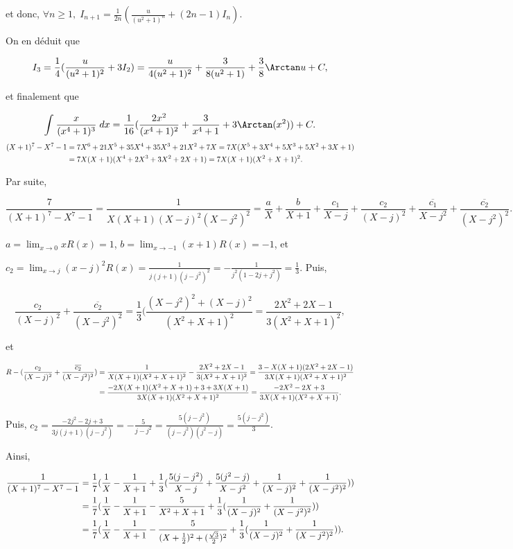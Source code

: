 {{et donc, $\forall n\geq1,\;I_{n+1}=\frac{1}{2n}(\frac{u}{(u^2+1)^n}+(2n-1)I_n)$.

On en déduit que

$$I_3=\frac{1}{4}(\frac{u}{(u^2+1)^2}+3I_2)=\frac{u}{4(u^2+1)^2}+\frac{3}{8(u^2+1)}+\frac{3}{8}\Arctan u+C,$$

et finalement que

$$\int_{}^{}\frac{x}{(x^4+1)^3}\;dx=\frac{1}{16}(\frac{2x^2}{(x^4+1)^2}+\frac{3}{x^4+1}+3\Arctan(x^2))+C.$$
\begin{align*}\ensuremath
(X+1)^7-X^7-1&=7X^6+21X^5+35X^4+35X^3+21X^2+7X=7X(X^5+3X^4+5X^3+5X^2+3X+1)\\
 &=7X(X+1)(X^4+2X^3+3X^2+2X+1)=7X(X+1)(X^2+X+1)^2.
\end{align*}

Par suite,

$$\frac{7}{(X+1)^7-X^7-1}=\frac{1}{X(X+1)(X-j)^2(X-j^2)^2}=\frac{a}{X}+\frac{b}{X+1}+\frac{c_1}{X-j}
+\frac{c_2}{(X-j)^2}+\frac{\overline{c_1}}{X-j^2}+\frac{\overline{c_2}}{(X-j^2)^2}.$$

$a=\lim_{x\rightarrow 0}xR(x)=1$, $b=\lim_{x\rightarrow -1}(x+1)R(x)=-1$, et

$c_2=\lim_{x\rightarrow j}(x-j)^2R(x)=\frac{1}{j(j+1)(j-j^2)^2}=-\frac{1}{j^2(1-2j+j^2)}=\frac{1}{3}$. Puis, 

$$\frac{c_2}{(X-j)^2}+\frac{\overline{c_2}}{(X-j^2)^2}=\frac{1}{3}(\frac{(X-j^2)^2+(X-j)^2}{(X^2+X+1)^2}
=\frac{2X^2+2X-1}{3(X^2+X+1)^2},$$

et

\begin{align*}\ensuremath
R-(\frac{c_2}{(X-j)^2}+\frac{\overline{c_2}}{(X-j^2)^2})
&=\frac{1}{X(X+1)(X^2+X+1)^2}-\frac{2X^2+2X-1}{3(X^2+X+1)^2}
=\frac{3-X(X+1)(2X^2+2X-1)}{3X(X+1)(X^2+X+1)^2}\\
 &=\frac{-2X(X+1)(X^2+X+1)+3+3X(X+1)}{3X(X+1)(X^2+X+1)^2}
=\frac{-2X^2-2X+3}{3X(X+1)(X^2+X+1)}.
\end{align*}

Puis, $c_2=\frac{-2j^2-2j+3}{3j(j+1)(j-j^2)}=-\frac{5}{j-j^2}=\frac{5(j-j^2)}{(j-j^2)(j^2-j)}=\frac{5(j-j^2)}{3}$.

Ainsi,

\begin{align*}\ensuremath
\frac{1}{(X+1)^7-X^7-1}&=\frac{1}{7}
(\frac{1}{X}-\frac{1}{X+1}+\frac{1}{3}(\frac{5(j-j^2)}{X-j}+\frac{5(j^2-j)}{X-j^2}+\frac{1}{(X-j)^2}+\frac{1}{(X-j^2)^2}))\\
 &=\frac{1}{7}
(\frac{1}{X}-\frac{1}{X+1}-\frac{5}{X^2+X+1}+\frac{1}{3}(\frac{1}{(X-j)^2}+\frac{1}{(X-j^2)^2}))\\
 &=\frac{1}{7}
(\frac{1}{X}-\frac{1}{X+1}-\frac{5}{(X+\frac{1}{2})^2+(\frac{\sqrt{3}}{2})^2}+\frac{1}{3}(\frac{1}{(X-j)^2}+\frac{1}{(X-j^2)^2})).
\end{align*}

}}
